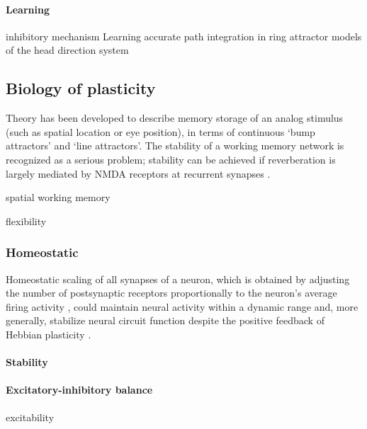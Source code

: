 \documentclass{article}
\theoremstyle{definition} \newtheorem{definition}{Definition}
\theoremstyle{remark} \newtheorem{remark}{Remark}
\newcounter{ct}
\begin{document}
\paragraph{Learning}
inhibitory mechanism \citep{couey2013recurrent}
Learning accurate path integration in ring attractor models of the head direction system \citep{vafidis2022hd}

\subsection{Biology of plasticity}

Theory has been developed to describe memory storage of an analog stimulus (such as spatial location or eye position), in terms of continuous ‘bump attractors' and ‘line attractors'.
The stability of a working memory network is recognized as a serious problem; stability can be achieved if reverberation is largely mediated by NMDA receptors at recurrent synapses \citep{wang2001synaptic}.

spatial working memory\citep{compte2000synaptic}

flexibility \citep{remington2018flexible}

\subsubsection{Homeostatic} \citep{turrigiano2004homeostatic}

Homeostatic scaling of all synapses of a neuron, which is obtained by adjusting the number of postsynaptic receptors proportionally to the neuron’s average firing activity \citep{turrigiano1998activity,turrigiano1999homeostatic},
 could maintain neural activity within a dynamic range and, more generally, stabilize neural circuit function despite the positive feedback of Hebbian plasticity \citep{toyoizumi2014modeling}. 
 
 \citep{niemeyer2021homeostasis}
 \citep{oleary2018homeostasis}
 
 \paragraph{Stability}
 \citep{aljaberi2021global}
 
 \paragraph{Excitatory-inhibitory balance}
 
 excitability \citep{daoudal2003long}
 
\end{document}
